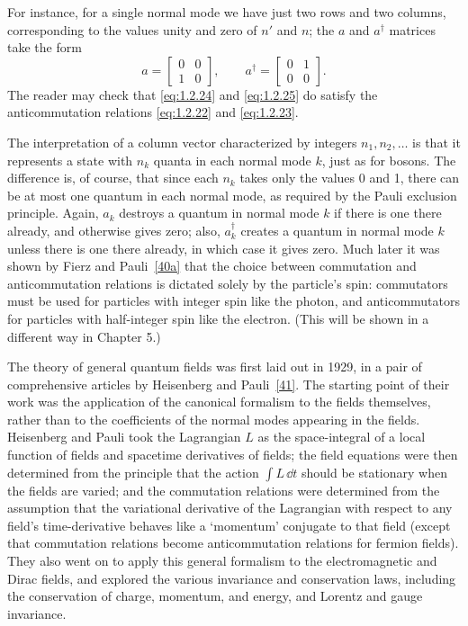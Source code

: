 For instance, for a single normal mode we have just two rows and two columns,
corresponding to the values unity and zero of $n'$ and $n$; the $a$ and
$a^{\dagger}$ matrices take the form
\[
  a=\begin{bmatrix}0&0\\1&0\end{bmatrix},
  \qquad
  a^{\dagger}=\begin{bmatrix}0&1\\0&0\end{bmatrix}.
\]
The reader may check that \eqref{eq:1.2.24} and \eqref{eq:1.2.25} do satisfy the
anticommutation relations \eqref{eq:1.2.22} and \eqref{eq:1.2.23}.

The interpretation of a column vector characterized by integers
$n_1,n_2,\ldots$ is that it represents a state with $n_k$ quanta in each
normal mode $k$, just as for bosons. The difference is, of course, that since
each $n_k$ takes only the values 0 and 1, there can be at most one quantum in
each normal mode, as required by the Pauli exclusion principle. Again, $a_k$
destroys a quantum in normal mode $k$ if there is one there already, and
otherwise gives zero; also, $a_k^{\dagger}$ creates a quantum in normal mode
$k$ unless there is one there already, in which case it gives zero. Much later
it was shown by Fierz and Pauli~\hyperref[ref:1.40a]{[40a]} that the choice between commutation and
anticommutation relations is dictated solely by the particle's spin:
commutators must be used for particles with integer spin like the photon, and
anticommutators for particles with half-integer spin like the electron. (This
will be shown in a different way in Chapter 5.)

The theory of general quantum fields was first laid out in 1929, in a pair of
comprehensive articles by Heisenberg and Pauli~\hyperref[ref:1.41]{[41]}. The starting point of
their work was the application of the canonical formalism to the fields
themselves, rather than to the coefficients of the normal modes appearing in
the fields. Heisenberg and Pauli took the Lagrangian $L$ as the space-integral
of a local function of fields and spacetime derivatives of fields; the field
equations were then determined from the principle that the action
$\int L\,\dd t$ should be stationary when the fields are varied; and the
commutation relations were determined from the assumption that the
variational derivative of the Lagrangian with respect to any field's
time-derivative behaves like a `momentum' conjugate to that field (except that
commutation relations become anticommutation relations for fermion fields).
They also went on to apply this general formalism to the electromagnetic and
Dirac fields, and explored the various invariance and conservation laws,
including the conservation of charge, momentum, and energy, and Lorentz and
gauge invariance.

